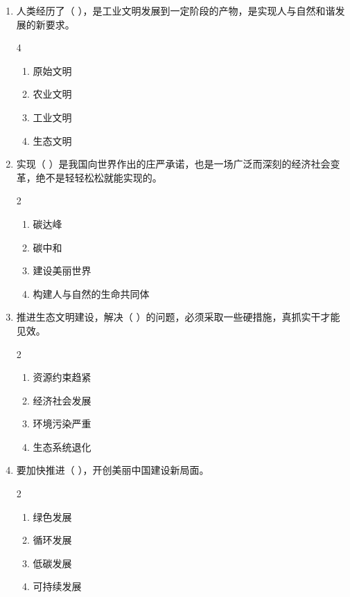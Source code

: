 \documentclass[a4paper,11pt]{ctexart}
\begin{document}
\begin{enumerate}
    \item 人类经历了（ ），是工业文明发展到一定阶段的产物，是实现人与自然和谐发展的新要求。
    \begin{multicols}{4}
    \begin{enumerate}
        \item 原始文明
        \item 农业文明
        \item 工业文明
        \item 生态文明
    \end{enumerate}
    \end{multicols}

    \item 实现（ ）是我国向世界作出的庄严承诺，也是一场广泛而深刻的经济社会变革，绝不是轻轻松松就能实现的。
    \begin{multicols}{2}
    \begin{enumerate}
        \item 碳达峰
        \item 碳中和
        \item 建设美丽世界
        \item 构建人与自然的生命共同体
    \end{enumerate}
    \end{multicols}

    \item 推进生态文明建设，解决（ ）的问题，必须采取一些硬措施，真抓实干才能见效。
    \begin{multicols}{2}
    \begin{enumerate}
        \item 资源约束趋紧
        \item 经济社会发展
        \item 环境污染严重
        \item 生态系统退化
    \end{enumerate}
    \end{multicols}

    \item 要加快推进（ ），开创美丽中国建设新局面。
    \begin{multicols}{2}
    \begin{enumerate}
        \item 绿色发展
        \item 循环发展
        \item 低碳发展
        \item 可持续发展
    \end{enumerate}
    \end{multicols}


\end{enumerate}
\end{document}
